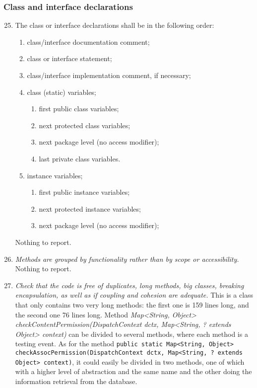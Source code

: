	\subsubsection{Class and interface declarations}
		\begin{enumerate}
			\setcounter{enumi}{24}
			\item \begin{itshape}
				The class or interface declarations shall be in the following order:
				\begin{enumerate}[label={(\alph*)}]
					\item class/interface documentation comment;
					\item class or interface statement;
					\item class/interface implementation comment, if necessary;
					\item class (static) variables;
						\begin{enumerate}[label=\roman*]
							\item first public class variables;
							\item next protected class variables;
							\item next package level (no access modifier);
							\item last private class variables.
						\end{enumerate}
					\item instance variables;
						\begin{enumerate}[label=\roman*]
							\item first public instance variables;
							\item next protected instance variables;
							\item next package level (no access modifier);
						\end{enumerate}
				\end{enumerate}
			\end{itshape}
			Nothing to report. %

			\item \textit{Methods are grouped by functionality rather than by scope or accessibility.}\newline
			Nothing to report. %

			\item \textit{Check that the code is free of duplicates, long methods, big classes, breaking encapsulation, as well as if coupling and cohesion are adequate.}
			This is a class that only contains two very long methods: the first one is 159 lines long, and the second one 76 lines long. Method \textit{Map<String, Object> checkContentPermission(DispatchContext dctx, Map<String, ? extends Object> context)} can be divided to several methods, where each method is a testing event. As for the method \texttt{public static Map<String, Object> checkAssocPermission(DispatchContext dctx, Map<String, ? extends Object> context)}, it could easily be divided in two methods, one of which with a higher level of abstraction and the same name and the other doing the information retrieval from the database. 
			
		\end{enumerate}

